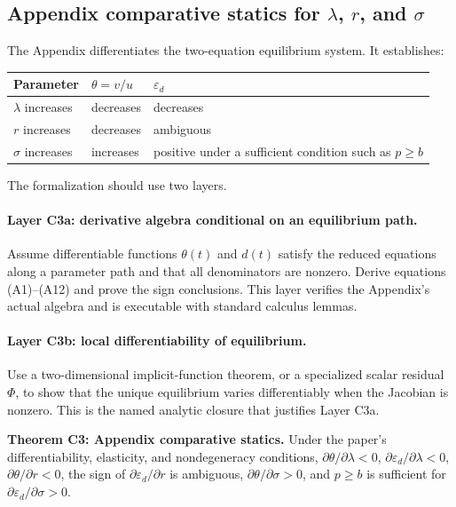 \documentclass[11pt]{article}
\newcommand{\epsd}{\varepsilon_d}
\newcommand{\resultname}[1]{\medskip\noindent\textbf{#1.}}
\begin{document}
\subsection{Appendix comparative statics for $\lambda$, $r$, and $\sigma$}

The Appendix differentiates the two-equation equilibrium system. It establishes:
\begin{center}
\begin{tabularx}{0.93\textwidth}{@{}lXX@{}}
\toprule
Parameter & $\theta=v/u$ & $\epsd$ \\
\midrule
$\lambda$ increases & decreases & decreases \\
$r$ increases & decreases & ambiguous \\
$\sigma$ increases & increases & positive under a sufficient condition such as $p\ge b$ \\
\bottomrule
\end{tabularx}
\end{center}

The formalization should use two layers.

\paragraph{Layer C3a: derivative algebra conditional on an equilibrium path.}
Assume differentiable functions $\theta(t)$ and $d(t)$ satisfy the reduced equations along a parameter path and that all denominators are nonzero. Derive equations (A1)--(A12) and prove the sign conclusions. This layer verifies the Appendix's actual algebra and is executable with standard calculus lemmas.

\paragraph{Layer C3b: local differentiability of equilibrium.}
Use a two-dimensional implicit-function theorem, or a specialized scalar residual $\Phi$, to show that the unique equilibrium varies differentiably when the Jacobian is nonzero. This is the named analytic closure that justifies Layer C3a.

\resultname{Theorem C3: Appendix comparative statics}
Under the paper's differentiability, elasticity, and nondegeneracy conditions, $\partial\theta/\partial\lambda<0$, $\partial\epsd/\partial\lambda<0$, $\partial\theta/\partial r<0$, the sign of $\partial\epsd/\partial r$ is ambiguous, $\partial\theta/\partial\sigma>0$, and $p\ge b$ is sufficient for $\partial\epsd/\partial\sigma>0$.
\end{document}

